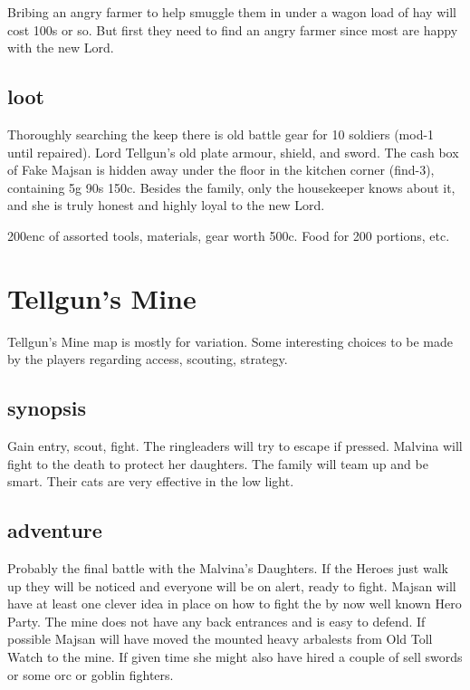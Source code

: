 Bribing an angry farmer to help smuggle them in under a wagon load of hay will cost 100s or so. But first they need to find an angry farmer since most are happy with the new Lord.


\subsection*{loot}
Thoroughly searching the keep there is old battle gear for 10 soldiers (mod-1 until repaired). Lord Tellgun's old plate armour, shield, and sword. The cash box of Fake Majsan is hidden away under the floor in the kitchen corner (find-3), containing 5g 90s 150c. Besides the family, only the housekeeper knows about it, and she is truly honest and highly loyal to the new Lord.

200enc of assorted tools, materials, gear worth 500c. Food for 200 portions, etc.








\section*{Tellgun's Mine}
Tellgun's Mine map is mostly for variation. Some interesting choices to be made by the players regarding access, scouting, strategy.


\subsection*{synopsis}
Gain entry, scout, fight. The ringleaders will try to escape if pressed. Malvina will fight to the death to protect her daughters. The family will team up and be smart. Their cats are very effective in the low light.


\subsection*{adventure}
Probably the final battle with the Malvina's Daughters. If the Heroes just walk up they will be noticed and everyone will be on alert, ready to fight. Majsan will have at least one clever idea in place on how to fight the by now well known Hero Party. The mine does not have any back entrances and is easy to defend. If possible Majsan will have moved the mounted heavy arbalests from Old Toll Watch to the mine. If given time she might also have hired a couple of sell swords or some orc or goblin fighters.


